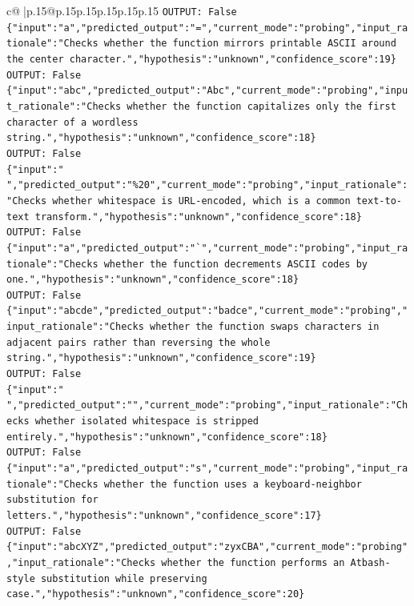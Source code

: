 \documentclass{article}
\begin{document}
{\begin{supertabular}{c@{$\;$}|p{.15\linewidth}@{}p{.15\linewidth}p{.15\linewidth}p{.15\linewidth}p{.15\linewidth}p{.15\linewidth}}
{{{\texttt{OUTPUT: False} \\
\texttt{\{"input":"a","predicted\_output":"=","current\_mode":"probing","input\_rationale":"Checks whether the function mirrors printable ASCII around the center character.","hypothesis":"unknown","confidence\_score":19\}} \\
\texttt{OUTPUT: False} \\
\texttt{\{"input":"abc","predicted\_output":"Abc","current\_mode":"probing","input\_rationale":"Checks whether the function capitalizes only the first character of a wordless string.","hypothesis":"unknown","confidence\_score":18\}} \\
\texttt{OUTPUT: False} \\
\texttt{\{"input":" ","predicted\_output":"\%20","current\_mode":"probing","input\_rationale":"Checks whether whitespace is URL{-}encoded, which is a common text{-}to{-}text transform.","hypothesis":"unknown","confidence\_score":18\}} \\
\texttt{OUTPUT: False} \\
\texttt{\{"input":"a","predicted\_output":"`","current\_mode":"probing","input\_rationale":"Checks whether the function decrements ASCII codes by one.","hypothesis":"unknown","confidence\_score":18\}} \\
\texttt{OUTPUT: False} \\
\texttt{\{"input":"abcde","predicted\_output":"badce","current\_mode":"probing","input\_rationale":"Checks whether the function swaps characters in adjacent pairs rather than reversing the whole string.","hypothesis":"unknown","confidence\_score":19\}} \\
\texttt{OUTPUT: False} \\
\texttt{\{"input":" ","predicted\_output":"","current\_mode":"probing","input\_rationale":"Checks whether isolated whitespace is stripped entirely.","hypothesis":"unknown","confidence\_score":18\}} \\
\texttt{OUTPUT: False} \\
\texttt{\{"input":"a","predicted\_output":"s","current\_mode":"probing","input\_rationale":"Checks whether the function uses a keyboard{-}neighbor substitution for letters.","hypothesis":"unknown","confidence\_score":17\}} \\
\texttt{OUTPUT: False} \\
\texttt{\{"input":"abcXYZ","predicted\_output":"zyxCBA","current\_mode":"probing","input\_rationale":"Checks whether the function performs an Atbash{-}style substitution while preserving case.","hypothesis":"unknown","confidence\_score":20\}} \\
}}}
\end{supertabular}}
\end{document}
